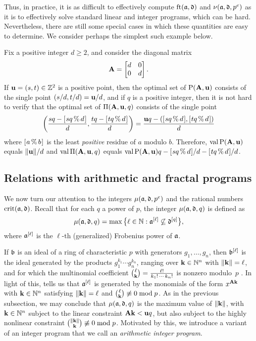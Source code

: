 \documentclass{article}
\begin{document}
Thus, in practice, it is as difficult to effectively compute $\operatorname{ft}(\mathfrak{a}, \mathfrak{d})$ and $\nu(\mathfrak{a}, \mathfrak{d}, p^e)$ as it is to effectively solve standard linear and integer programs, which can be hard.
Nevertheless, there are still some special cases in which these quantities are easy to determine.
We consider perhaps the simplest such example below.

\begin{example}
\label{concrete-solution-to-LP-IP: E}  
Fix a positive integer $d \ge 2$, and consider the diagonal matrix 
\[ \mathbf{A} = \begin{bmatrix} d & 0 \\ 0 & d \end{bmatrix}. \] 
If $\mathbf{u} = (s, t) \in \mathbb{Z}^2$ is a positive point, then the optimal set of $\mathrm{P}(\mathbf{A},\mathbf{u})$ consists of the single point $(s/d, t/d)= \mathbf{u}/d$, and if $q$ is a positive integer, then it is not hard to verify that the optimal set of $\Pi(\mathbf{A}, \mathbf{u}, q)$ consists of the single point
\[ \left( \frac{s q  - [ \hspace{.01in} s q \, \% \, d \hspace{.01in} ]}{d},  \frac{t q  - [ \hspace{.01in} t q \, \% \, d \hspace{.01in} ]}{d} \right) = \frac{\mathbf{u}q - ([ \hspace{.01in} sq \, \% \, d \hspace{.01in} ], [ \hspace{.01in} tq \, \% \, d \hspace{.01in} ])}{d} \] 
where $[ \hspace{.01in} a \, \% \, b \hspace{.01in} ]$ is the least \emph{positive} residue of $a$ modulo $b$.  Therefore, $\operatorname{val} \mathrm{P}(\mathbf{A},\mathbf{u})$ equals $\| \mathbf{u} \|/d$ and $\operatorname{val} \Pi(\mathbf{A},\mathbf{u},q)$ equals $\operatorname{val} \mathrm{P}(\mathbf{A},\mathbf{u})  q - [ \hspace{.01in} sq \, \% \, d \hspace{.01in} ]/d-[ \hspace{.01in} tq \, \% \, d \hspace{.01in} ]/d$.
\end{example}

\subsection{Relations with arithmetic and fractal programs}

We now turn our attention to the integers $\mu(\mathfrak{a}, \mathfrak{d}, p^e)$ and the rational numbers $\operatorname{crit}(\mathfrak{a},\mathfrak{d})$.
Recall that for each $q$ a power of $p$, the integer $\mu(\mathfrak{a}, \mathfrak{d}, q)$ is defined as
\[\mu(\mathfrak{a},\mathfrak{d},q) = \max\big\{ \ell \in \mathbb{N} : \mathfrak{a}^{[\ell]} \not\subseteq \mathfrak{d}^{[q]}\big\},\]
where $\mathfrak{a}^{[\ell]}$ is the $\ell$-th (generalized) Frobenius power of $\mathfrak{a}$.

If $\mathfrak{b}$ is an ideal of a ring of characteristic $p$ with generators $g_1, \ldots, g_n$, then $\mathfrak{b}^{[\ell]}$ is the ideal generated by the products $g_1^{k_1}\cdots g_n^{k_n}$, ranging over $\mathbf{k} \in \mathbb{N}^n$ with $\| \mathbf{k} \|=\ell$, and for which the multinomial coefficient $\binom{\ell}{\mathbf{k}} =
\frac{\ell!}{k_1 !\, \cdots\, k_n !}$ is nonzero modulo~$p$ \cite[Proposition~3.5]{hernandez+etal.frobenius_powers}.
In light of this,  tells us that $\mathfrak{a}^{[\ell]}$ is generated by the monomials of the form $x^{\mathbf{A} \mathbf{k}}$ with $\mathbf{k} \in \mathbb{N}^n$ satisfying $\| \mathbf{k} \|=\ell$ and $\binom{\ell}{\mathbf{k}} \not\equiv 0 \bmod p$.  As in the previous subsection, we may conclude that $\mu(\mathfrak{a},\mathfrak{d},q)$ is the maximum value of $\| \mathbf{k} \|$, with $\mathbf{k} \in \mathbb{N}^n$ subject to the linear constraint $\mathbf{A}\mathbf{k} < \mathbf{u}q$, but also subject to the highly nonlinear constraint $\binom{\| \mathbf{k} \|}{\mathbf{k}} \not\equiv 0 \bmod{p}$.  Motivated by this, we introduce a variant of an integer program that we call an \emph{arithmetic integer program}.
\end{document}
